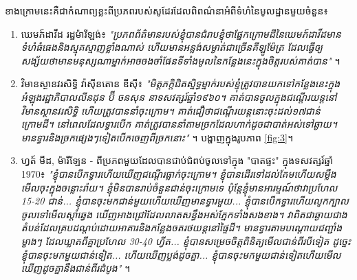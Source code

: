 \documentclass[10pt,twocolumn,letterpaper]{article}
\begin{document}
ខាងក្រោមនេះគឺជាកំណាព្យខ្លះពីប្រភពរបស់សូដែរដែលពិពណ៌នាអំពីទំហំនៃមូលដ្ឋានមួយចំនួន៖
\begin{flushleft}
\begin{enumerate}
    \item ឃេមភ៍ដាវីដ រដ្ឋម៉ារីឡង់៖ \textit{"ប្រភពព័ត៌មានរបស់ខ្ញុំបានជំរាបខ្ញុំថាផ្នែកក្រោមដីនៃឃេមភ៍ដាវីដមានទំហំធំធេងនិងស្មុគស្មាញខ្លាំងណាស់ ហើយមានអន្លង់សម្ងាត់ជាច្រើនគីឡូម៉ែត្រ ដែលធ្វើឲ្យសង្ស័យថាមានមនុស្សណាម្នាក់អាចចងចាំផែនទីទាំងមូលនៃកន្លែងនេះក្នុងចិត្តរបស់គាត់បាន"} \cite{22}។
    \item វិមានស្ថានវរសិទ្ធិ វ៉ាស៊ីនតោន ឌីស៊ី៖ \textit{"មិត្តភក្តិជិតស្និទ្ធម្នាក់របស់ខ្ញុំត្រូវបានយកទៅកន្លែងនេះក្នុងអំឡុងរដ្ឋាភិបាលលីនដុន ប៊ី ចនសុន នាទសវត្សរ៍ឆ្នាំ១៩៦០។ គាត់បានចូលក្នុងជណ្តើរយន្តនៅវិមានស្ថានវរសិទ្ធិ ហើយត្រូវបាននាំចុះក្រោម។ គាត់ជឿថាជណ្តើរយន្តនោះចុះដល់១៧ជាន់ក្រោមដី។ នៅពេលដែលទ្វារបើក គាត់ត្រូវបាននាំតាមច្រកដែលហាក់ដូចជាបាត់អស់ទៅឆ្ងាយ។ មានទ្វារនិងច្រកផ្សេងៗទៀតបើកចេញពីច្រកនោះ"} \cite{22}។ បង្ហាញក្នុងរូបភាព \ref{fig:3}។
   \item ហ្វត៍ មីដ, ម៉ារីឡែន - ពីប្រភពមួយដែលបានជាប់ជំពប់ចូលទៅក្នុង "បាតផ្ទះ" ក្នុងទសវត្សរ៍ឆ្នាំ 1970៖ \textit{"ខ្ញុំបានបើកទ្វារហើយឃើញជណ្តើរធ្លាក់ចុះក្រោម។ ខ្ញុំបានដើរទៅដល់គែមហើយសម្លឹងមើលចុះក្នុងចន្លោះរ៉ាយ។ ខ្ញុំមិនបានរាប់ចំនួនជាន់ចុះក្រោមទេ ប៉ុន្តែខ្ញុំមានអារម្មណ៍ថាវាប្រហែល 15-20 ជាន់... ខ្ញុំបានចុះមកជាន់មួយហើយឃើញមានទ្វារមួយ... ខ្ញុំបានបើកទ្វារហើយលូកក្បាលចូលទៅមើលស្តាំឆ្វេង ឃើញអាងជ្រៅដែលលាតសន្ធឹងអស់ភ្នែកទាំងសងខាង។ វាពិតជាឆ្ងាយជាងតំបន់ដែលគ្របដណ្តប់ដោយអាគារនិងកន្លែងចតរថយន្តនៅផ្ទៃដី។ មានទ្វារតាមបណ្តោយជញ្ជាំងម្ខាងៗ ដែលឃ្លាតពីគ្នាប្រហែល 30-40 ហ្វីត... ខ្ញុំបានសម្រេចចិត្តពិនិត្យមើលជាន់ពីរបីទៀត ដូច្នេះខ្ញុំបានចុះមកមួយជាន់ទៀត... ហើយឃើញប្លង់ដូចគ្នា... ខ្ញុំបានចុះមកមួយជាន់ទៀតហើយមើលឃើញដូចគ្នានឹងជាន់ពីរដំបូង"} \cite{22}។
\end{enumerate}
\end{flushleft}
\end{document}
